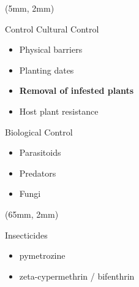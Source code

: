 \begin{frame}{}
    \begin{textblock*}{55mm}(5mm, 2mm)
        \begin{bluebox}{Control}
            Cultural Control
            \begin{itemize}[<+->]
                \item
                    Physical barriers
                \item
                    Planting dates
                \item
                    \textbf{Removal of infested plants}
                \item
                    Host plant resistance
            \end{itemize}
            Biological Control
            \tcblower
            \begin{itemize}[<+->]
                \item
                    Parasitoids
                \item
                    Predators
                \item
                    Fungi
            \end{itemize}
        \end{bluebox}
    \end{textblock*}
%
    \begin{textblock*}{60mm}(65mm, 2mm)
        \begin{yellowbox}{Insecticides}
            \begin{itemize}
                \item 
                    pymetrozine
                 \item 
                    zeta-cypermethrin / bifenthrin
            \end{itemize}
        \end{yellowbox}
        \begin{graybox}{}
            \begin{bibunit}[apalike]
                \nocite{Shun-xiang2001}
                \nocite{Smith2014}
                \putbib
            \end{bibunit}
        \end{graybox}
    \end{textblock*}
\end{frame}

